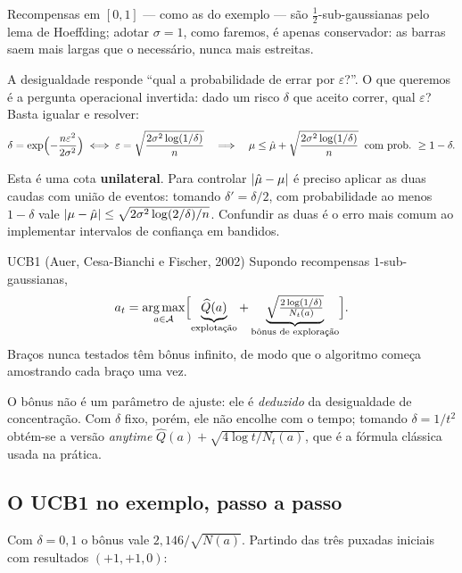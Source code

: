 \documentclass[11pt, a4paper]{article}
\newcommand{\Qhat}{\widehat{Q}}
\newcommand{\muhat}{\hat{\mu}}
\newcommand{\Nc}{N}
\begin{document}
Recompensas em $[0,1]$ — como as do exemplo — são $\tfrac12$-sub-gaussianas
pelo lema de Hoeffding; adotar $\sigma = 1$, como faremos, é apenas
conservador: as barras saem mais largas que o necessário, nunca mais
estreitas.

A desigualdade responde ``qual a probabilidade de errar por
$\varepsilon$?''. O que queremos é a pergunta operacional invertida: dado um
risco $\delta$ que aceito correr, qual $\varepsilon$? Basta igualar e
resolver:
\[
  \delta = \exp\Bigl(-\frac{n\varepsilon^2}{2\sigma^2}\Bigr)
  \iff
  \varepsilon = \sqrt{\frac{2\sigma^2\log(1/\delta)}{n}}
  \quad\Longrightarrow\quad
  \mu \le \muhat + \sqrt{\frac{2\sigma^2\log(1/\delta)}{n}}
  \;\;\text{com prob.\ } \ge 1 - \delta.
\]

\begin{alertabox}
Esta é uma cota \textbf{unilateral}. Para controlar $\abs{\muhat - \mu}$ é
preciso aplicar as duas caudas com união de eventos: tomando
$\delta' = \delta/2$, com probabilidade ao menos $1-\delta$ vale
$\abs{\mu - \muhat} \le \sqrt{2\sigma^2\log(2/\delta)/n}$. Confundir as duas
é o erro mais comum ao implementar intervalos de confiança em bandidos.
\end{alertabox}

\begin{algbox}{UCB1 (Auer, Cesa-Bianchi e Fischer, 2002)}
Supondo recompensas $1$-sub-gaussianas,
\[
  a_t = \argmax_{a\in\gA}\Bigl[\underbrace{\Qhat(a)}_{\text{explotação}}
    + \underbrace{\sqrt{\tfrac{2\log(1/\delta)}{\Nc_t(a)}}}_{\text{bônus de exploração}}\Bigr].
\]
Braços nunca testados têm bônus infinito, de modo que o algoritmo começa
amostrando cada braço uma vez.
\end{algbox}

O bônus não é um parâmetro de ajuste: ele é \emph{deduzido} da desigualdade
de concentração. Com $\delta$ fixo, porém, ele não encolhe com o tempo;
tomando $\delta = 1/t^2$ obtém-se a versão \emph{anytime}
$\Qhat(a) + \sqrt{4\log t/\Nc_t(a)}$, que é a fórmula clássica usada na
prática.

\subsection*{O UCB1 no exemplo, passo a passo}

Com $\delta = 0{,}1$ o bônus vale $2{,}146/\sqrt{\Nc(a)}$. Partindo das três
puxadas iniciais com resultados $(+1, +1, 0)$:
\end{document}
